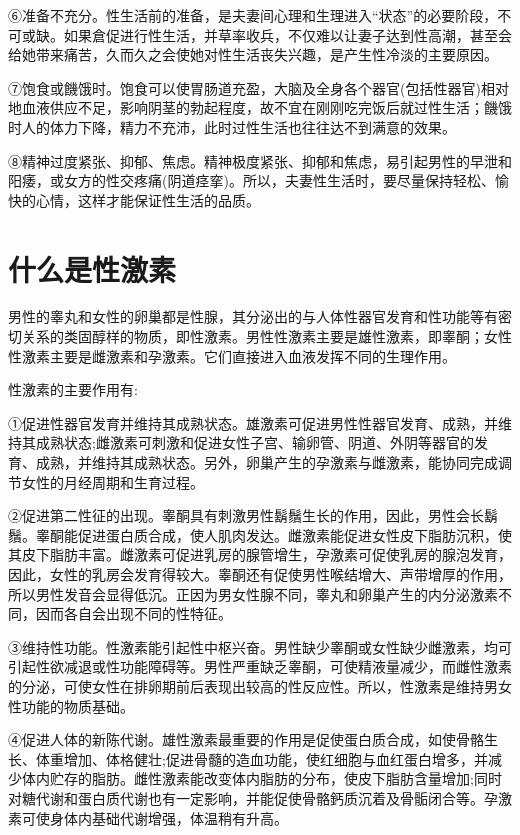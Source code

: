 \documentclass[12pt,UTF8]{ctexbook}
\begin{document}
⑥准备不充分。性生活前的准备，是夫妻间心理和生理进入“状态”的必要阶段，不可或缺。如果倉促进行性生活，并草率收兵，不仅难以让妻子达到性高潮，甚至会给她带来痛苦，久而久之会使她对性生活丧失兴趣，是产生性冷淡的主要原因。

⑦饱食或饑饿时。饱食可以使胃肠道充盈，大脑及全身各个器官(包括性器官)相对地血液供应不足，影响阴茎的勃起程度，故不宜在刚刚吃完饭后就过性生活；饑饿时人的体力下降，精力不充沛，此时过性生活也往往达不到满意的效果。

⑧精神过度紧张、抑郁、焦虑。精神极度紧张、抑郁和焦虑，易引起男性的早泄和阳痿，或女方的性交疼痛(阴道痉挛)。所以，夫妻性生活时，要尽量保持轻松、愉快的心情，这样才能保证性生活的品质。

\section{什么是性激素}

男性的睾丸和女性的卵巢都是性腺，其分泌出的与人体性器官发育和性功能等有密切关系的类固醇样的物质，即性激素。男性性激素主要是雄性激素，即睾酮；女性性激素主要是雌激素和孕激素。它们直接进入血液发挥不同的生理作用。

性激素的主要作用有:

①促进性器官发育并维持其成熟状态。雄激素可促进男性性器官发育、成熟，并维持其成熟状态;雌激素可刺激和促进女性子宫、输卵管、阴道、外阴等器官的发育、成熟，并维持其成熟状态。另外，卵巢产生的孕激素与雌激素，能协同完成调节女性的月经周期和生育过程。

②促进第二性征的出现。睾酮具有刺激男性鬍鬚生长的作用，因此，男性会长鬍鬚。睾酮能促进蛋白质合成，使人肌肉发达。雌激素能促进女性皮下脂肪沉积，使其皮下脂肪丰富。雌激素可促进乳房的腺管增生，孕激素可促使乳房的腺泡发育，因此，女性的乳房会发育得较大。睾酮还有促使男性喉结增大、声带增厚的作用，所以男性发音会显得低沉。正因为男女性腺不同，睾丸和卵巢产生的内分泌激素不同，因而各自会出现不同的性特征。

③维持性功能。性激素能引起性中枢兴奋。男性缺少睾酮或女性缺少雌激素，均可引起性欲减退或性功能障碍等。男性严重缺乏睾酮，可使精液量减少，而雌性激素的分泌，可使女性在排卵期前后表现出较高的性反应性。所以，性激素是维持男女性功能的物质基础。

④促进人体的新陈代谢。雄性激素最重要的作用是促使蛋白质合成，如使骨骼生长、体重增加、体格健壮;促进骨髓的造血功能，使红细胞与血红蛋白增多，并减少体内贮存的脂肪。雌性激素能改变体内脂肪的分布，使皮下脂肪含量增加;同时对糖代谢和蛋白质代谢也有一定影响，并能促使骨骼鈣质沉着及骨骺闭合等。孕激素可使身体内基础代谢增强，体温稍有升高。
\end{document}
